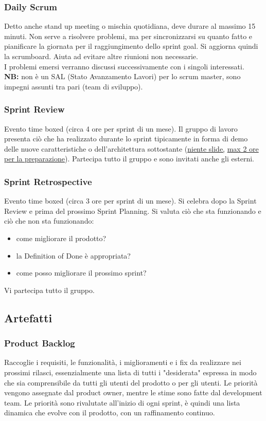 \documentclass[10pt, a4paper]{article}
\begin{document}
\subsubsection*{Daily Scrum}
Detto anche stand up meeting o mischia quotidiana, deve durare al massimo 15 minuti. Non serve a risolvere problemi, ma per sincronizzarsi su quanto fatto e pianificare la giornata per il raggiungimento dello sprint goal. Si aggiorna quindi la scrumboard. Aiuta ad evitare altre riunioni non necessarie.\\
I problemi emersi verranno discussi successivamente con i singoli interessati.\\
\textbf{NB:} non è un SAL (Stato Avanzamento Lavori) per lo scrum master, sono impegni assunti tra pari (team di sviluppo).

\subsubsection*{Sprint Review}
Evento time boxed (circa 4 ore per sprint di un mese).
Il gruppo di lavoro presenta ciò che ha realizzato durante lo sprint tipicamente in forma di demo delle nuove caratteristiche o dell'architettura sottostante (\underline{niente slide,} \underline{max 2 ore per la preparazione}).
Partecipa tutto il gruppo e sono invitati anche gli esterni.

\subsubsection*{Sprint Retrospective}
Evento time boxed (circa 3 ore per sprint di un mese). Si celebra dopo la Sprint Review e prima del prossimo Sprint Planning. Si valuta ciò che sta funzionando e ciò che non sta funzionando:
\begin{itemize}
	\item come migliorare il prodotto?
	\item la Definition of Done è appropriata?
	\item come posso migliorare il prossimo sprint?
\end{itemize}
Vi partecipa tutto il gruppo.
\subsection{Artefatti}
\subsubsection*{Product Backlog}
Raccoglie i requisiti, le funzionalità, i miglioramenti e i fix da realizzare nei prossimi rilasci, essenzialmente una lista di tutti i "desiderata" espressa in modo che sia comprensibile da tutti gli utenti del prodotto o per gli utenti. Le priorità vengono assegnate dal product owner, mentre le stime sono fatte dal development team. Le priorità sono rivalutate all'inizio di ogni sprint, è quindi una lista dinamica che evolve con il prodotto, con un raffinamento continuo.
\end{document}
